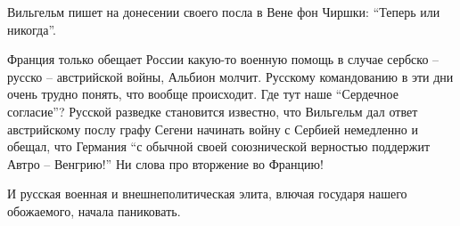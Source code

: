 Вильгельм пишет на донесении своего посла в Вене фон Чиршки: \enquote{Теперь или
никогда}.

Франция только обещает России какую-то военную помощь в случае
сербско -- русско -- австрийской войны, Альбион молчит. Русскому командованию в
эти дни очень трудно понять, что вообще происходит. Где тут наше \enquote{Сердечное
согласие}? Русской разведке становится известно, что Вильгельм дал ответ
австрийскому послу графу Сегени начинать войну с Сербией немедленно и обещал,
что Германия \enquote{с обычной своей союзнической верностью поддержит Автро -- Венгрию!}
Ни слова про вторжение во Францию!

И русская военная и внешнеполитическая элита, влючая государя нашего обожаемого,
начала паниковать.
